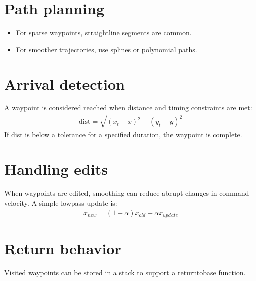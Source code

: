 \documentclass[letterpaper,10pt,english]{sphinxmanual}
\begin{document}
\section{Path planning}
\label{\detokenize{appendix_o_waypoint_navigation:path-planning}}\begin{itemize}
\item {} 
\sphinxAtStartPar
For sparse waypoints, straight\sphinxhyphen{}line segments are common.

\item {} 
\sphinxAtStartPar
For smoother trajectories, use splines or polynomial paths.

\end{itemize}


\section{Arrival detection}
\label{\detokenize{appendix_o_waypoint_navigation:arrival-detection}}
\sphinxAtStartPar
A waypoint is considered reached when distance and timing constraints are met:
\begin{equation*}
\begin{split}\text{dist} = \sqrt{(x_t - x)^2 + (y_t - y)^2}\end{split}
\end{equation*}
\sphinxAtStartPar
If dist is below a tolerance for a specified duration, the waypoint is complete.


\section{Handling edits}
\label{\detokenize{appendix_o_waypoint_navigation:handling-edits}}
\sphinxAtStartPar
When waypoints are edited, smoothing can reduce abrupt changes in command
velocity. A simple low\sphinxhyphen{}pass update is:
\begin{equation*}
\begin{split}x_{new} = (1 - \alpha) x_{old} + \alpha x_{update}\end{split}
\end{equation*}

\section{Return behavior}
\label{\detokenize{appendix_o_waypoint_navigation:return-behavior}}
\sphinxAtStartPar
Visited waypoints can be stored in a stack to support a return\sphinxhyphen{}to\sphinxhyphen{}base function.
\end{document}
